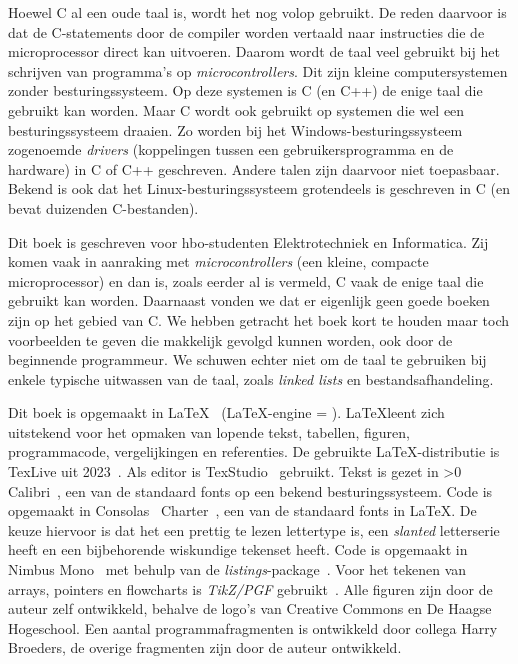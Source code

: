 Hoewel C al een oude taal is, wordt het nog volop gebruikt. De reden daarvoor is
dat de C-statements door de compiler worden vertaald naar instructies die de
microprocessor direct kan uitvoeren. Daarom wordt de taal veel gebruikt bij
het schrijven van programma's op \textsl{microcontrollers}. Dit zijn kleine
computersystemen
zonder besturingssysteem. Op deze systemen is C (en C++) de enige taal die
gebruikt kan worden. Maar C wordt ook gebruikt op systemen die wel een
besturingssysteem draaien. Zo worden bij het Windows-besturingssysteem
zogenoemde \textsl{drivers} (koppelingen tussen een gebruikersprogramma
en de hardware) in C of C++ geschreven. Andere talen zijn
daarvoor niet toepasbaar. Bekend is ook dat het Linux-besturingssysteem
grotendeels is geschreven in C (en bevat duizenden C-bestanden).

Dit boek is geschreven voor hbo-studenten Elektrotechniek en Informatica. Zij
komen vaak in aanraking met \textsl{microcontrollers} (een kleine, compacte
microprocessor) en dan is, zoals eerder al
is vermeld, C vaak de enige taal die gebruikt kan worden. Daarnaast vonden we dat
er eigenlijk geen goede boeken zijn op het gebied van C. We hebben getracht het
boek kort te houden maar toch voorbeelden te geven die makkelijk gevolgd kunnen
worden, ook door de beginnende programmeur. We schuwen echter niet om de taal
te gebruiken bij enkele typische uitwassen van de taal, zoals \textsl{linked lists}
en bestandsafhandeling.

Dit boek is opgemaakt in \LaTeX~\cite{latexwebsite} (\LaTeX-engine = \booktexbanner).
\LaTeX\@ leent zich uitstekend
voor het opmaken van lopende tekst, tabellen, figuren, programmacode, vergelijkingen
en referenties. De gebruikte \LaTeX-distributie is TexLive uit 2023~\cite{texlivewebsite}.
Als editor is TexStudio~\cite{texstudiowebsite} gebruikt. Tekst is gezet in
\fi{}\fi>0
Calibri~\cite{calibrifont}, een van de standaard fonts op een bekend besturingssysteem.
Code is opgemaakt in Consolas~\cite{consolasfont}
\else
Charter~\cite{charterfont}, een van de standaard fonts in \LaTeX.
De keuze hiervoor is dat het een prettig te lezen lettertype is, een
\textsl{slanted} letterserie heeft en een bijbehorende wiskundige tekenset heeft.
Code is opgemaakt in Nimbus Mono~\cite{nimbusfont}
\fi
met behulp van de \textsl{listings}-package~\cite{listingsctan}.
Voor het
tekenen van arrays, pointers en flowcharts is \textsl{TikZ/PGF} gebruikt~\cite{tikzctan}.
Alle figuren zijn door de auteur zelf ontwikkeld, behalve de logo's van Creative
Commons en De Haagse Hogeschool.
Een aantal programmafragmenten is ontwikkeld door collega Harry Broeders, de overige
fragmenten zijn door de auteur ontwikkeld.

